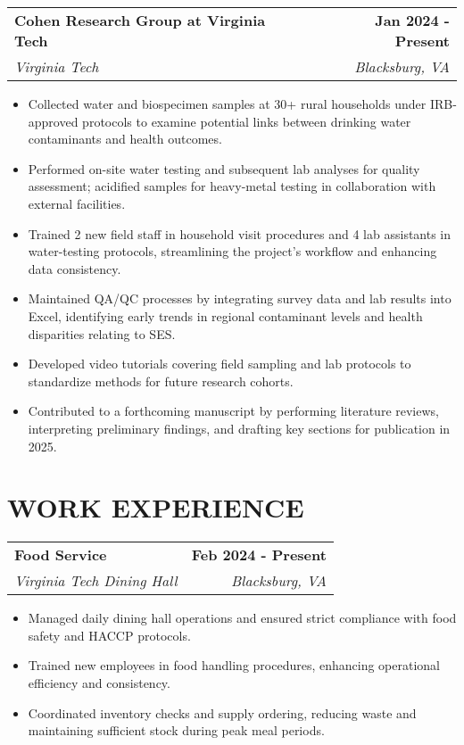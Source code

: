 \documentclass[10pt]{article}
\begin{document}
\noindent
\begin{tabularx}{\textwidth}{X r}
\textbf{Cohen Research Group at Virginia Tech} & \textbf{Jan 2024 - Present}\\
\textit{Virginia Tech} & \textit{Blacksburg, VA} \\
\end{tabularx}
\begin{itemize}[leftmargin=0.75cm, noitemsep, topsep=0pt]
    \item Collected water and biospecimen samples at 30+ rural households under IRB-approved protocols to examine potential links between drinking water contaminants and health outcomes.
    \item Performed on-site water testing and subsequent lab analyses for quality assessment; acidified samples for heavy-metal testing in collaboration with external facilities.
    \item Trained 2 new field staff in household visit procedures and 4 lab assistants in water-testing protocols, streamlining the project’s workflow and enhancing data consistency.
    \item Maintained QA/QC processes by integrating survey data and lab results into Excel, identifying early trends in regional contaminant levels and health disparities relating to SES.
    \item Developed video tutorials covering field sampling and lab protocols to standardize methods for future research cohorts.
    \item Contributed to a forthcoming manuscript by performing literature reviews, interpreting preliminary findings, and drafting key sections for publication in 2025.
\end{itemize}

\section*{WORK EXPERIENCE}

\noindent
\begin{tabularx}{\textwidth}{X r}
\textbf{Food Service} & \textbf{Feb 2024 - Present}\\
\textit{Virginia Tech Dining Hall} & \textit{Blacksburg, VA}
\end{tabularx}
\begin{itemize}[leftmargin=0.75cm, noitemsep, topsep=0pt]
    \item Managed daily dining hall operations and ensured strict compliance with food safety and HACCP protocols.
    \item Trained new employees in food handling procedures, enhancing operational efficiency and consistency.
    \item Coordinated inventory checks and supply ordering, reducing waste and maintaining sufficient stock during peak meal periods.
\end{itemize}
\end{document}
